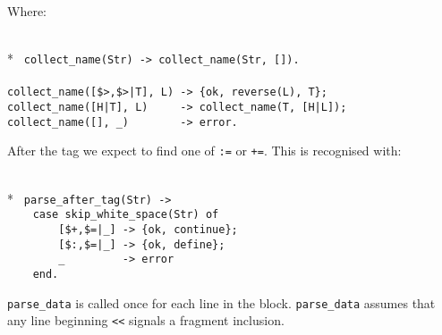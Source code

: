 Where:

\begin{flushleft}
\label{parsing_10_13}
\\*
\tt
\noindent{}%
\verb&collect_name(Str) -> collect_name(Str, []).&\\
\noindent{}%
\verb&&\\
\noindent{}%
\verb&collect_name([$>,$>|T], L) -> {ok, reverse(L), T};&\\
\noindent{}%
\verb&collect_name([H|T], L)     -> collect_name(T, [H|L]);&\\
\noindent{}%
\verb&collect_name([], _)        -> error.&\\
\end{flushleft}

    After  the tag    we   expect to   find    one  of \verb+:=+    or
\verb|+=|. This is recognised with:

\begin{flushleft}
\label{parsing_11_13}
\\*
\tt
\noindent{}%
\verb&parse_after_tag(Str) ->&\\
\noindent{}%
\verb&    case skip_white_space(Str) of&\\
\noindent{}%
\verb&        [$+,$=|_] -> {ok, continue};&\\
\noindent{}%
\verb&        [$:,$=|_] -> {ok, define};&\\
\noindent{}%
\verb&        _         -> error&\\
\noindent{}%
\verb&    end.&\\
\end{flushleft}


\verb+parse_data+ is called once for each line in the block.
\verb+parse_data+ assumes that any line beginning \verb+<<+ 
signals a fragment inclusion.

